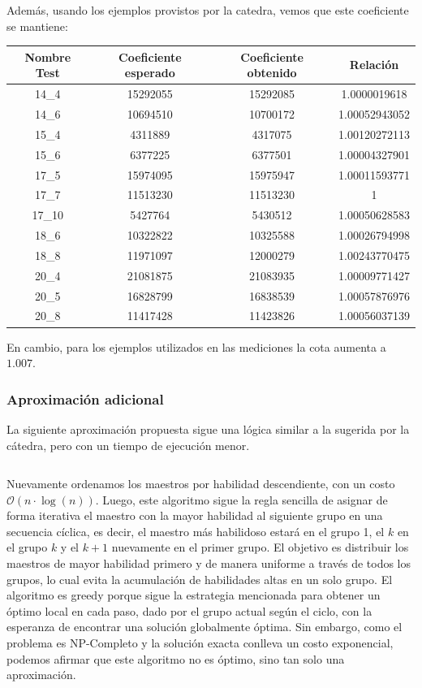 \documentclass{article}
\begin{document}
Además, usando los ejemplos provistos por la catedra, vemos que este coeficiente se mantiene:

\begin{center}
\begin{tabular}{ |c|c|c|c| } 
 \hline
 Nombre Test & Coeficiente esperado & Coeficiente obtenido & Relación \\ 
 \hline
  14\_4 & 15292055  & 15292085 & 1.0000019618 \\
 \hline
  14\_6 & 10694510  & 10700172 & 1.00052943052 \\
 \hline
  15\_4 & 4311889   & 4317075  & 1.00120272113 \\
 \hline
  15\_6 & 6377225   & 6377501  & 1.00004327901 \\
 \hline
  17\_5 & 15974095  & 15975947 & 1.00011593771 \\
 \hline
  17\_7 & 11513230  & 11513230 & 1 \\
 \hline
  17\_10 & 5427764  & 5430512  & 1.00050628583 \\
 \hline
  18\_6 & 10322822  & 10325588 & 1.00026794998 \\
 \hline
  18\_8 & 11971097  & 12000279 & 1.00243770475 \\
 \hline
  20\_4 & 21081875  & 21083935 & 1.00009771427 \\
 \hline
  20\_5 & 16828799  & 16838539 & 1.00057876976 \\
 \hline
  20\_8 & 11417428  & 11423826 & 1.00056037139 \\
  \hline
\end{tabular}
\end{center}

En cambio, para los ejemplos utilizados en las mediciones la cota aumenta a $1.007$.

\subsubsection{Aproximación adicional}

La siguiente aproximación propuesta sigue una lógica similar a la sugerida por la cátedra, pero con un tiempo de ejecución menor.

\inputminted[linenos, firstline=3, lastline=33]{python}{codigo/aproximacion_adicional.py}

Nuevamente ordenamos los maestros por habilidad descendiente, con un costo $\mathcal{O}(n\cdot \log(n))$. Luego, este algoritmo sigue la regla sencilla de asignar de forma iterativa el maestro con la mayor habilidad al siguiente grupo en una secuencia cíclica, es decir, el maestro más habilidoso estará en el grupo 1, el $k$ en el grupo $k$ y el $k+1$ nuevamente en el primer grupo. El objetivo es distribuir los maestros de mayor habilidad primero y de manera uniforme a través de todos los grupos, lo cual evita la acumulación de habilidades altas en un solo grupo. El algoritmo es greedy porque sigue la estrategia mencionada para obtener un óptimo local en cada paso, dado por el grupo actual según el ciclo, con la esperanza de encontrar una solución globalmente óptima. Sin embargo, como el problema es NP-Completo y la solución exacta conlleva un costo exponencial, podemos afirmar que este algoritmo no es óptimo, sino tan solo una aproximación. 
\end{document}
